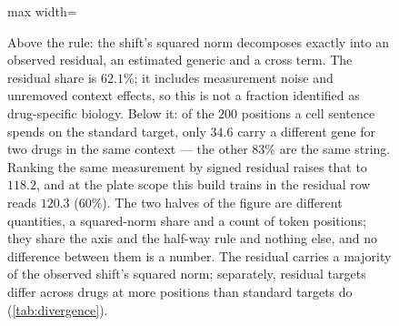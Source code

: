 \begin{figure}[htbp]
\begin{fullwidth}
\begin{adjustbox}{max width=\linewidth}
\end{adjustbox}
\caption[Observed residual magnitude and target divergence]{ Above the rule: the shift's squared
norm decomposes exactly into an observed residual, an estimated generic and
a cross term. The residual share is $62.1\%$; it includes measurement noise and
unremoved context effects, so this is not a fraction identified as drug-specific
biology. Below it: of the $200$ positions a cell sentence spends on the
standard target, only $34.6$ carry a different gene for two drugs in the same
context --- the other $83\%$ are the same string. Ranking the same measurement
by signed residual raises that to $118.2$, and at the plate scope this build
trains in the residual row reads $120.3$ ($60\%$). The two halves of the figure
are different quantities, a squared-norm share and a count of token positions;
they share the axis and the half-way rule and nothing else, and no difference
between them is a number. The residual carries a majority of the observed
shift's squared norm; separately, residual targets differ across drugs at more
positions than standard targets do (\cref{tab:divergence}).}
\label{fig:residual-energy}
\end{fullwidth}
\end{figure}
